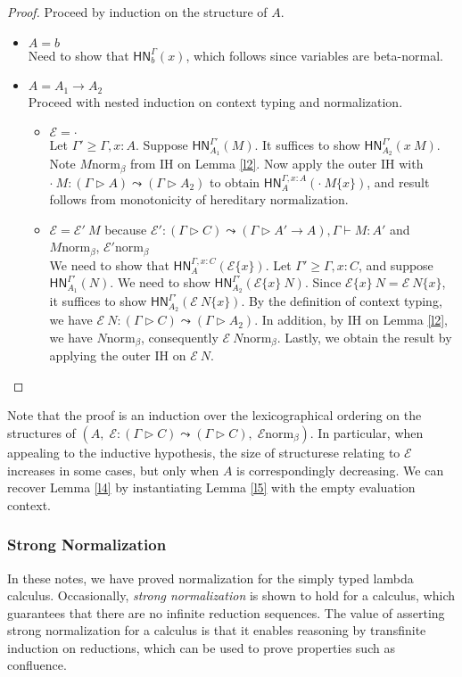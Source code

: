 \documentclass{article}
\newcommand{\hasEF}[3]{\ensuremath{#1 \vdash #2 : #3}}
\newcommand{\hasC}[5]{\ensuremath{#1 : (#2 \rhd #3) \leadsto (#4 \rhd #5)}}
\newcommand{\bnorm}[1]{\ensuremath{#1 \mathrel{\text{norm}_\beta}}}
\newcommand{\hnorm}[3]{\ensuremath{\mathsf{HN}^{#1}_{#2}(#3)}}
\newcommand{\fillin}[2]{\ensuremath{#1\{#2\}}}
\newcommand{\fn}[2]{\ensuremath{#1 \to #2}}
\newcommand{\ap}[2]{\ensuremath{#1\ #2}}
\newcommand{\E}{\mathcal{E}}
\begin{document}
\begin{proof}
Proceed by induction on the structure of $A$.
\begin{itemize}
  \setlength\itemsep{1em}
  \item $A = b$\\
  Need to show that \hnorm{\Gamma}{b}{x}, which follows since variables are beta-normal.
  \item $A = \fn{A_1}{A_2}$\\
  Proceed with nested induction on context typing and normalization.
  \begin{itemize}
  \setlength\itemsep{1em}
  \item $\E = \cdot$\\
  Let $\Gamma' \ge \Gamma,x:A$. Suppose \hnorm{\Gamma'}{A_1}{M}. It suffices to show \hnorm{\Gamma'}{A_2}{\ap{x}{M}}. 
  Note \bnorm{M} from IH on Lemma \ref{l2}.
  Now apply the outer IH with $\hasC{\ap{\cdot}{M}}{\Gamma}{A}{\Gamma}{A_2}$ to obtain 
  \hnorm{\Gamma,x:A}{A}{\fillin{\ap{\cdot}{M}}{x}}, and result follows from monotonicity of hereditary normalization.
  \item $\E = \ap{\E'}{M}$ because $\hasC{\E'}{\Gamma}{C}{\Gamma}{\fn{A'}{A}}, \hasEF{\Gamma}{M}{A'}$ and 
  \bnorm{M}, \bnorm{\E'}\\
  We need to show that \hnorm{\Gamma,x:C}{A}{\fillin{\E}{x}}. Let $\Gamma' \ge \Gamma,x:C$, and 
  suppose \hnorm{\Gamma'}{A_1}{N}. We need to show \hnorm{\Gamma'}{A_2}{\ap{\fillin{\E}{x}}{N}}. Since
  $\ap{\fillin{\E}{x}}{N} = \fillin{\ap{\E}{N}}{x}$, it suffices to show \hnorm{\Gamma'}{A_2}{\fillin{\ap{\E}{N}}{x}}.
  By the definition of context typing, we have \hasC{\ap{\E}{N}}{\Gamma}{C}{\Gamma}{A_2}. In addition, 
  by IH on Lemma \ref{l2}, we have $\bnorm{N}$, consequently $\bnorm{\ap{\E}{N}}$. Lastly, we obtain the result by applying the outer IH on $\ap{\E}{N}$.
  \end{itemize}
\end{itemize}
\end{proof}

Note that the proof is an induction over the lexicographical ordering on the structures of 
$(A,\; \hasC{\E}{\Gamma}{C}{\Gamma}{C},\; \bnorm{\E})$. In particular, when appealing to the inductive hypothesis,
the size of structurese relating to $\E$ increases in some cases, but only when $A$ is correspondingly decreasing. We can recover Lemma \ref{l4} by instantiating Lemma \ref{l5} with the empty evaluation context.

\subsubsection{Strong Normalization}

In these notes, we have proved normalization for the simply typed lambda calculus.
Occasionally, \emph{strong normalization} is shown to hold for a calculus, which guarantees
that there are no infinite reduction sequences. The value of asserting strong normalization
for a calculus is that it enables reasoning by transfinite induction on reductions, which can be used to prove 
properties such as confluence. 



\end{document}
